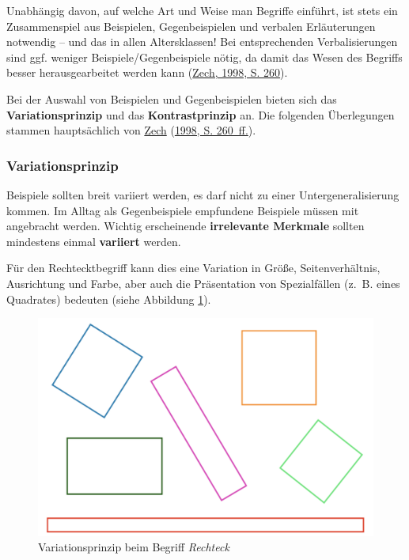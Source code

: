 \documentclass[
  ngerman,
]{scrbook}
\theoremstyle{definition}
\theoremstyle{definition}
\theoremstyle{definition}
\theoremstyle{definition}
\theoremstyle{remark}
\begin{document}
Unabhängig davon, auf welche Art und Weise man Begriffe einführt, ist stets ein Zusammenspiel aus Beispielen, Gegenbeispielen und verbalen Erläuterungen notwendig -- und das in allen Altersklassen! Bei entsprechenden Verbalisierungen sind ggf. weniger Beispiele/Gegenbeispiele nötig, da damit das Wesen des Begriffs besser herausgearbeitet werden kann (\protect\hyperlink{ref-Zech1998}{Zech, 1998, S. 260}).

Bei der Auswahl von Beispielen und Gegenbeispielen bieten sich das \textbf{Variationsprinzip} und das \textbf{Kontrastprinzip} an. Die folgenden Überlegungen stammen hauptsächlich von \protect\hyperlink{ref-Zech1998}{Zech} (\protect\hyperlink{ref-Zech1998}{1998, S. 260~ff.}).

\hypertarget{variationsprinzip}{%
\subsubsection{Variationsprinzip}\label{variationsprinzip}}

Beispiele sollten breit variiert werden, es darf nicht zu einer Untergeneralisierung kommen. Im Alltag als Gegenbeispiele empfundene Beispiele müssen mit angebracht werden. Wichtig erscheinende \textbf{irrelevante Merkmale} sollten mindestens einmal \textbf{variiert} werden.

Für den Rechtecktbegriff kann dies eine Variation in Größe, Seitenverhältnis, Ausrichtung und Farbe, aber auch die Präsentation von Spezialfällen (z.~B. eines Quadrates) bedeuten (siehe Abbildung \ref{fig:VariationRechteck}).



\begin{figure}

{\centering \includegraphics[width=0.75\linewidth]{pictures/6-Variation} 

}

\caption{Variationsprinzip beim Begriff \emph{Rechteck}}\label{fig:VariationRechteck}
\end{figure}
\end{document}
